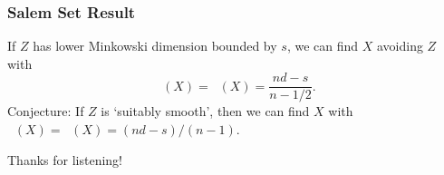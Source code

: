 \documentclass[usenames,dvipsnames]{beamer}
\DeclareMathOperator{\fordim}{\text{dim}_{\textbf{F}}}
\DeclareMathOperator{\hausdim}{\text{dim}_{\textbf{H}}}
\begin{document}






\begin{frame}
    \frametitle{Salem Set Result}

    \pause
    \begin{theorem}[2020, Denson]
        If $Z$ has lower Minkowski dimension bounded by $s$, we can find $X$ avoiding $Z$ with
        \[ \hausdim(X) = \fordim(X) = \frac{nd - s}{n - 1/2}. \]
        \pause
        Conjecture: If $Z$ is `suitably smooth', then we can find $X$ with $\hausdim(X) = \fordim(X) = (nd - s)/(n-1)$.
    \end{theorem}
\end{frame}

\begin{frame}

\begin{center}
    \huge Thanks for listening!
\end{center}

\end{frame}
\end{document}
